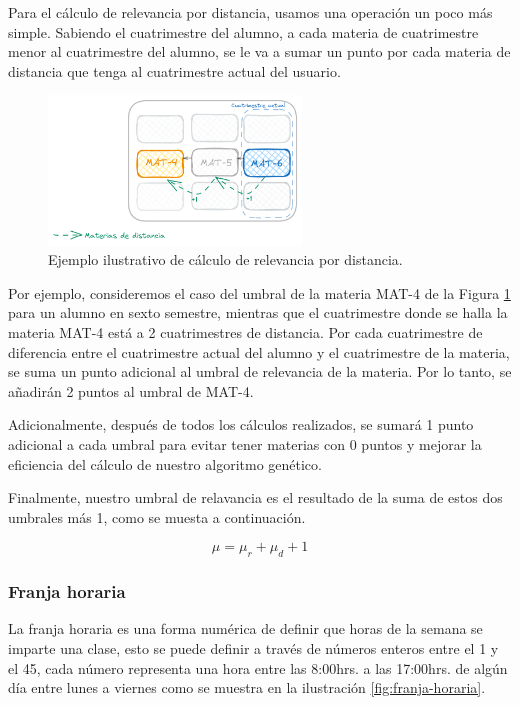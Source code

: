 Para el cálculo de relevancia por distancia, usamos una operación un poco más simple. Sabiendo el cuatrimestre del alumno, a cada materia de cuatrimestre menor al cuatrimestre del alumno, se le va a sumar un punto por cada materia de distancia que tenga al cuatrimestre actual del usuario.

\begin{figure}[h]
    \centering
    \includegraphics[width=0.6\textwidth]{images/AG-Simple-Serial-Umbral-Relevancia.png}
    \caption{Ejemplo ilustrativo de cálculo de relevancia por distancia.}
    \label{fig:ejemplo_ilustrativo_calculo_de_relevancia_por_distancia}
\end{figure}

Por ejemplo, consideremos el caso del umbral de la materia MAT-4 de la Figura \ref{fig:ejemplo_ilustrativo_calculo_de_relevancia_por_distancia} para un alumno en sexto semestre, mientras que el cuatrimestre donde se halla la materia MAT-4 está a 2 cuatrimestres de distancia. Por cada cuatrimestre de diferencia entre el cuatrimestre actual del alumno y el cuatrimestre de la materia, se suma un punto adicional al umbral de relevancia de la materia. Por lo tanto, se añadirán 2 puntos al umbral de MAT-4.

Adicionalmente, después de todos los cálculos realizados, se sumará 1 punto adicional a cada umbral para evitar tener materias con 0 puntos y mejorar la eficiencia del cálculo de nuestro algoritmo genético.

Finalmente, nuestro umbral de relavancia es el resultado de la suma de estos dos umbrales más 1, como se muesta a continuación.

\begin{equation}
    \mu = \mu_r + \mu_d + 1
    \label{eq:umbral_relevancia}
\end{equation}
\clearpage
\subsubsection{Franja horaria}\label{franjas-horarias}
La franja horaria es una forma numérica de definir que horas de la semana se imparte una clase, esto se puede definir a través de números enteros entre el 1 y el 45, cada número representa una hora entre las 8:00hrs. a las 17:00hrs. de algún día entre lunes a viernes como se muestra en la ilustración \ref{fig:franja-horaria}.

